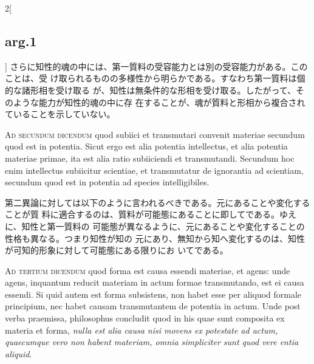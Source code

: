 \documentclass[paper=a4paper,fontsize=10pt,jafontsize=9pt,titlepage]{jlreq}
\begin{document}
\begin{paracol}{2}[\subsection{arg.1}]
さらに知性的魂の中には、第一質料の受容能力とは別の受容能力がある。このことは、受
け取られるものの多様性から明らかである。すなわち第一質料は個的な諸形相を受け取る
が、知性は無条件的な形相を受け取る。したがって、そのような能力が知性的魂の中に存
在することが、魂が質料と形相から複合されていることを示していない。

\switchcolumn*[\subsection{ad 2}]

{\scshape Ad secundum dicendum} quod subiici et transmutari convenit materiae
secundum quod est in potentia. Sicut ergo est alia potentia intellectus, et alia
potentia materiae primae, ita est alia ratio subiiciendi et
transmutandi. Secundum hoc enim intellectus subiicitur scientiae, et
transmutatur de ignorantia ad scientiam, secundum quod est in potentia ad
species intelligibiles.

\switchcolumn

第二異論に対しては以下のように言われるべきである。元にあることや変化することが質
料に適合するのは、質料が可能態にあることに即してである。ゆえに、知性と第一質料の
可能態が異なるように、元にあることや変化することの性格も異なる。つまり知性が知の
元にあり、無知から知へ変化するのは、知性が可知的形象に対して可能態にある限りにお
いてである。

\switchcolumn*[\subsection{ad 3}]

{\scshape Ad tertium dicendum} quod forma est causa essendi materiae, et agens:
unde agens, inquantum reducit materiam in actum formae transmutando, est ei
causa essendi. Si quid autem est forma subsistens, non habet esse per aliquod
formale principium, nec habet causam transmutantem de potentia in actum. Unde
post verba praemissa, philosophus concludit quod in his quae sunt composita ex
materia et forma, {\itshape nulla est alia causa nisi movens ex potestate ad
actum, quaecumque vero non habent materiam, omnia simpliciter sunt quod vere
entia aliquid}.

\switchcolumn


\end{paracol}
\end{document}
